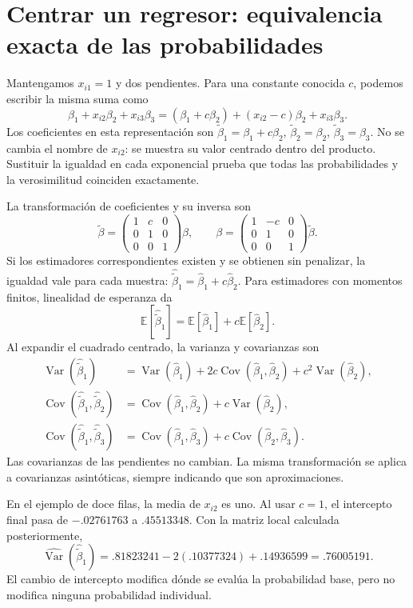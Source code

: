 \documentclass[11pt,a4paper]{article}
\newcommand{\E}{\mathbb E}
\DeclareMathOperator{\Var}{Var}
\DeclareMathOperator{\Cov}{Cov}
\begin{document}
\clearpage
\section{Centrar un regresor: equivalencia exacta de las probabilidades}\label{logit73}
Mantengamos \(x_{i1}=1\) y dos pendientes.
Para una constante conocida \(c\), podemos escribir la misma suma como
\[
\beta_1+x_{i2}\beta_2+x_{i3}\beta_3
=(\beta_1+c\beta_2)+(x_{i2}-c)\beta_2+x_{i3}\beta_3.
\]
Los coeficientes en esta representación son
\(\widetilde\beta_1=\beta_1+c\beta_2\),
\(\widetilde\beta_2=\beta_2\), \(\widetilde\beta_3=\beta_3\).
No se cambia el nombre de \(x_{i2}\): se muestra su
valor centrado dentro del producto.
Sustituir la igualdad en cada exponencial prueba
que todas las probabilidades y la verosimilitud coinciden exactamente.

La transformación de coeficientes y su inversa son
\[
\widetilde\beta=
\begin{pmatrix}1&c&0\\0&1&0\\0&0&1\end{pmatrix}\beta,
\qquad
\beta=
\begin{pmatrix}1&-c&0\\0&1&0\\0&0&1\end{pmatrix}\widetilde\beta.
\]
Si los estimadores correspondientes existen y se obtienen
sin penalizar, la igualdad vale para cada muestra:
\(\widehat{\widetilde\beta}_1=\widehat\beta_1+c\widehat\beta_2\).
Para estimadores con momentos finitos, linealidad de esperanza da
\[
\E[\widehat{\widetilde\beta}_1]
=\E[\widehat\beta_1]+c\E[\widehat\beta_2].
\]
Al expandir el cuadrado centrado, la varianza y covarianzas son
\[
\begin{aligned}
\Var(\widehat{\widetilde\beta}_1)
&=\Var(\widehat\beta_1)+2c\Cov(\widehat\beta_1,\widehat\beta_2)
+c^2\Var(\widehat\beta_2),\\
\Cov(\widehat{\widetilde\beta}_1,\widehat{\widetilde\beta}_2)
&=\Cov(\widehat\beta_1,\widehat\beta_2)+c\Var(\widehat\beta_2),\\
\Cov(\widehat{\widetilde\beta}_1,\widehat{\widetilde\beta}_3)
&=\Cov(\widehat\beta_1,\widehat\beta_3)
+c\Cov(\widehat\beta_2,\widehat\beta_3).
\end{aligned}
\]
Las covarianzas de las pendientes no cambian.
La misma transformación se aplica a covarianzas asintóticas,
siempre indicando que son aproximaciones.

En el ejemplo de doce filas, la media de \(x_{i2}\) es uno.
Al usar \(c=1\), el intercepto final pasa de
\(-.02761763\) a \(.45513348\).
Con la matriz local calculada posteriormente,
\[
\widehat{\Var}(\widehat{\widetilde\beta}_1)
=.81823241-2(.10377324)+.14936599=.76005191.
\]
El cambio de intercepto modifica dónde se evalúa la probabilidad
base, pero no modifica ninguna probabilidad individual.
\end{document}
